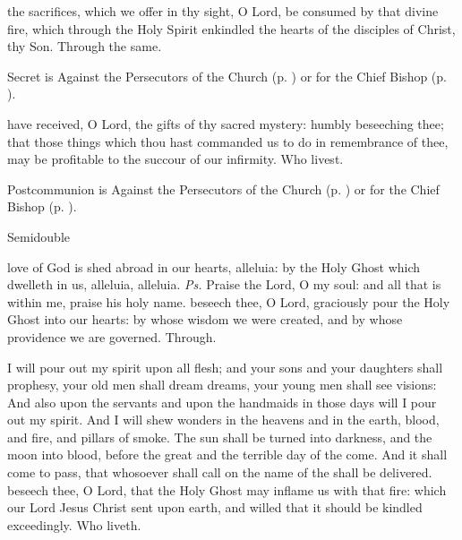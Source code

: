 \secret
{} the sacrifices, which we offer in thy sight, O Lord, be consumed by that divine fire, which through the Holy Spirit enkindled the hearts of the disciples of Christ, thy Son. Through the same.
\begin{rubric}
     Secret is Against the Persecutors of the Church (p. \pageref{SPAgainst}) or for the Chief Bishop (p. \pageref{SPChiefBishop}).
\end{rubric}

\postcommunion
{} have received, O Lord, the gifts of thy sacred mystery: humbly beseeching thee; that those things which thou hast commanded us to do in remembrance of thee, may be profitable to the succour of our infirmity. Who livest.
\begin{rubric}
     Postcommunion is Against the Persecutors of the Church (p. \pageref{SPAgainst}) or for the Chief Bishop (p. \pageref{SPChiefBishop}).
\end{rubric}


\begin{inhead}
    {Semidouble}
\end{inhead}
\par\noindent
{}
\introit
{} love of God is shed abroad in our hearts, alleluia: by the Holy Ghost which dwelleth in us, alleluia, alleluia. \textit{Ps.} Praise the Lord, O my soul: and all that is within me, praise his holy name.
\collect
{} beseech thee, O Lord, graciously pour the Holy Ghost into our hearts: by whose wisdom we were created, and by whose providence we are governed. Through.

 I will pour out my spirit upon all flesh; and your sons and your daughters shall prophesy, your old men shall dream dreams, your young men shall see visions: And also upon the servants and upon the handmaids in those days will I pour out my spirit. And I will shew wonders in the heavens and in the earth, blood, and fire, and pillars of smoke. The sun shall be turned into darkness, and the moon into blood, before the great and the terrible day of the  come. And it shall come to pass, that whosoever shall call on the name of the  shall be delivered.
\collect
{} beseech thee, O Lord, that the Holy Ghost may inflame us with that fire: which our Lord Jesus Christ sent upon earth, and willed that it should be kindled exceedingly. Who liveth.

